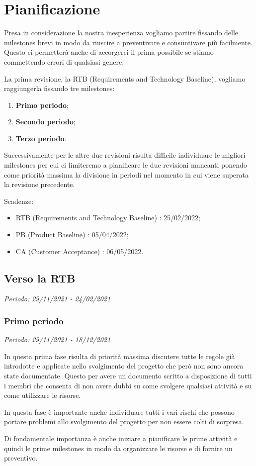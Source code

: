 \chapter{Pianificazione}

Presa in considerazione la nostra inesperienza vogliamo partire fissando delle milestones
brevi in modo da riuscire a preventivare e consuntivare più facilmente. Questo ci permetterà
anche di accorgerci il prima possibile se stiamo commettendo errori di qualsiasi genere.

La prima revisione, la RTB (Requirements and Technology Baseline), vogliamo raggiungerla fissando tre milestones:
\begin{enumerate}
    \item \textbf{Primo periodo};
    \item \textbf{Secondo periodo};
    \item \textbf{Terzo periodo}.
\end{enumerate}

\noindent Successivamente per le altre due revisioni risulta difficile individuare le migliori
milestones per cui ci limiteremo a pianificare le due revisioni mancanti ponendo come priorità
massima la divisione in periodi nel momento in cui viene superata la revisione precedente.

Scadenze:
\begin{itemize}
    \item RTB (Requirements and Technology Baseline) : 25/02/2022;
    \item PB (Product Baseline) : 05/04/2022;
    \item CA (Customer Acceptance) : 06/05/2022.
\end{itemize}

\newpage

\section{Verso la RTB}

\textit{Periodo: 29/11/2021 - 24/02/2021}

\subsection{Primo periodo}

\textit{Periodo: 29/11/2021 - 18/12/2021}

In questa prima fase risulta di priorità massima discutere tutte le regole già introdotte
e applicate nello svolgimento del progetto che però non sono ancora state documentate.
Questo per avere un documento scritto a disposizione di tutti i membri che consenta di
non avere dubbi su come svolgere qualsiasi attività e su come utilizzare le risorse.
\par In questa fase è importante anche individuare tutti i vari rischi che possono portare
problemi allo svolgimento del progetto per non essere colti di sorpresa.
\par Di fondamentale importanza è anche iniziare a pianificare le prime attività e quindi
le prime milestones in modo da organizzare le risorse e di fornire un preventivo. 

